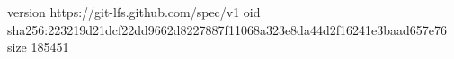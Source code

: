 version https://git-lfs.github.com/spec/v1
oid sha256:223219d21dcf22dd9662d8227887f11068a323e8da44d2f16241e3baad657e76
size 185451
